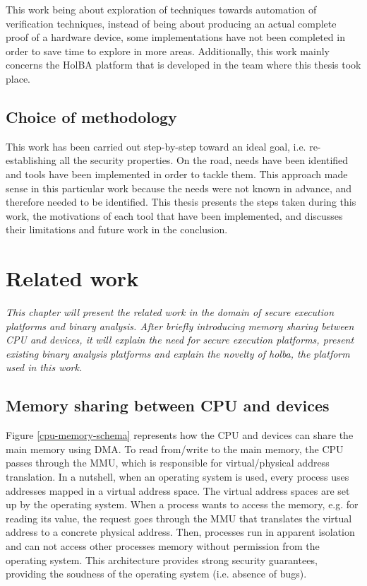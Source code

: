 \documentclass{kththesis}
\begin{document}
This work being about exploration of techniques towards automation of verification techniques, instead of being about producing an actual complete proof of a hardware device, some implementations have not been completed in order to save time to explore in more areas. Additionally, this work mainly concerns the HolBA platform that is developed in the team where this thesis took place.

\section{Choice of methodology}

This work has been carried out step-by-step toward an ideal goal, i.e. re-establishing all the security properties. On the road, needs have been identified and tools have been implemented in order to tackle them. This approach made sense in this particular work because the needs were not known in advance, and therefore needed to be identified. This thesis presents the steps taken during this work, the motivations of each tool that have been implemented, and discusses their limitations and future work in the conclusion.

\chapter{Related work} \label{related-work}
\vspace{-1cm}
\textit{This chapter will present the related work in the domain of secure execution platforms and binary analysis. After briefly introducing memory sharing between \gls{CPU} and devices, it will explain the need for secure execution platforms, present existing binary analysis platforms and explain the novelty of \gls{holba}, the platform used in this work.}

\section{Memory sharing between CPU and devices}

Figure \ref{cpu-memory-schema} represents how the \gls{CPU} and devices can share the main memory using \gls{DMA}. To read from/write to the main memory, the CPU passes through the \gls{MMU}, which is responsible for virtual/physical address translation. In a nutshell, when an operating system is used, every process uses addresses mapped in a virtual address space. The virtual address spaces are set up by the operating system. When a process wants to access the memory, e.g. for reading its value, the request goes through the MMU that translates the virtual address to a concrete physical address. Then, processes run in apparent isolation and can not access other processes memory without permission from the operating system. This architecture provides strong security guarantees, providing the soudness of the operating system (i.e. absence of bugs).
\end{document}
